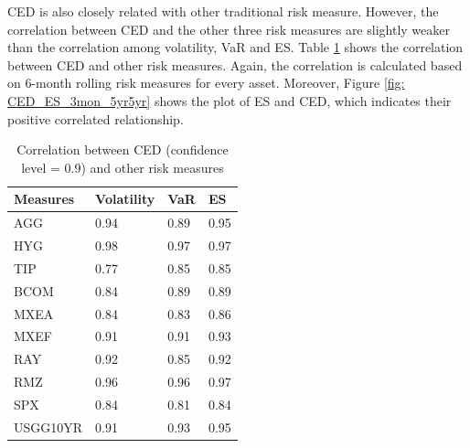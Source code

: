 \fi

CED is also closely related with other traditional risk measure. However, the correlation between CED and the other three risk measures are slightly weaker than the correlation among volatility, VaR and ES. Table \ref{table:corrRiskMeasureCED} shows the correlation between CED and other risk measures. Again, the correlation is calculated based on 6-month rolling risk measures for every asset. Moreover, Figure \ref{fig: CED_ES_3mon_5yr5yr} shows the plot of ES and CED, which indicates their positive correlated relationship.


\begin{table}[!h]
\caption{Correlation between CED (confidence level = 0.9) and other risk measures}
\centering 
\begin{tabular}{ p{2cm}||p{2cm}|p{2cm}|p{2cm}} 
\hline
Measures & Volatility & VaR & ES\\
  \hline
AGG & 0.94 & 0.89 & 0.95\\ 
HYG & 0.98 & 0.97 & 0.97\\ 
TIP & 0.77 & 0.85 & 0.85\\ 
BCOM & 0.84 & 0.89 & 0.89\\ 
MXEA & 0.84 & 0.83 & 0.86\\ 
MXEF & 0.91 & 0.91 & 0.93\\ 
RAY & 0.92 & 0.85 & 0.92\\ 
RMZ & 0.96 & 0.96 & 0.97\\ 
SPX & 0.84 & 0.81 & 0.84\\ 
USGG10YR & 0.91 & 0.93 & 0.95\\
\hline
\end{tabular}
\label{table:corrRiskMeasureCED}
\end{table}



\iffalse

